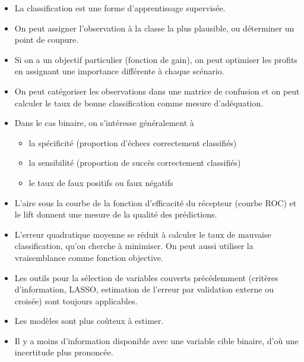 \documentclass[
  11pt,
  letterpaper,
]{scrbook}
\providecommand{\tightlist}{%
  \setlength{\itemsep}{0pt}\setlength{\parskip}{0pt}}\usepackage{longtable,booktabs,array}
\theoremstyle{definition}
\theoremstyle{remark}
\begin{document}
\begin{tcolorbox}[enhanced jigsaw, opacityback=0, colbacktitle=quarto-callout-note-color!10!white, leftrule=.75mm, left=2mm, colframe=quarto-callout-note-color-frame, toptitle=1mm, breakable, arc=.35mm, colback=white, bottomtitle=1mm, title=\textcolor{quarto-callout-note-color}{\faInfo}\hspace{0.5em}{En résumé}, rightrule=.15mm, titlerule=0mm, toprule=.15mm, bottomrule=.15mm, opacitybacktitle=0.6, coltitle=black]

\begin{itemize}
\tightlist
\item
  La classification est une forme d'apprentissage supervisée.
\item
  On peut assigner l'observation à la classe la plus plausible, ou
  déterminer un point de coupure.
\item
  Si on a un objectif particulier (fonction de gain), on peut optimiser
  les profits en assignant une importance différente à chaque scénario.
\item
  On peut catégoriser les observations dans une matrice de confusion et
  on peut calculer le taux de bonne classification comme mesure
  d'adéquation.
\item
  Dans le cas binaire, on s'intéresse généralement à

  \begin{itemize}
  \tightlist
  \item
    la spécificité (proportion d'échecs correctement classifiés)
  \item
    la sensibilité (proportion de succès correctement classifiés)
  \item
    le taux de faux positifs ou faux négatifs
  \end{itemize}
\item
  L'aire sous la courbe de la fonction d'efficacité du récepteur (courbe
  ROC) et le lift donnent une mesure de la qualité des prédictions.
\item
  L'erreur quadratique moyenne se réduit à calculer le taux de mauvaise
  classification, qu'on cherche à minimiser. On peut aussi utiliser la
  vraisemblance comme fonction objective.
\item
  Les outils pour la sélection de variables couverts précédemment
  (critères d'information, LASSO, estimation de l'erreur par validation
  externe ou croisée) sont toujours applicables.
\item
  Les modèles sont plus coûteux à estimer.
\item
  Il y a moins d'information disponible avec une variable cible binaire,
  d'où une incertitude plus prononcée.
\end{itemize}

\end{tcolorbox}
\end{document}
